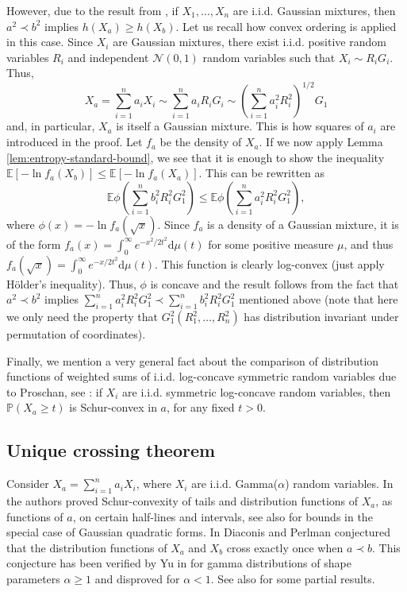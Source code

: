 \documentclass[11pt]{amsart}
\newcommand{\mb}[1]{\mathbb{{#1}}}
\newcommand{\mc}[1]{\mathcal{{#1}}}
\newcommand{\dd}{\mathrm{d}}
\newcommand{\1}{\mathbf{1}}
\newcommand{\E}{\mathbb{E}}
\theoremstyle{definition}
\theoremstyle{definition}
\theoremstyle{remark}
\begin{document}
However, due to the result from \cite{ENT18}, if $X_1,\ldots, X_n$ are i.i.d. Gaussian mixtures, then $a^2 \prec b^2$ implies $h(X_a) \geq h(X_b)$. Let us recall how convex ordering is applied in this case. Since $X_i$ are Gaussian mixtures, there exist i.i.d. positive random variables $R_i$ and independent $\mc{N}(0,1)$ random variables such that $X_i \sim R_i G_i$. Thus, 
\[
X_a = \sum_{i=1}^n a_i X_i \sim \sum_{i=1}^n a_i R_i G_i \sim \left(\sum_{i=1}^n a_i^2 R_i^2 \right)^{1/2} G_1
\]
and, in particular, $X_a$ is itself a Gaussian mixture.
This is how squares of $a_i$ are introduced in the proof. Let $f_a$ be the density of $X_a$. If we now apply Lemma \ref{lem:entropy-standard-bound}, we see that it is enough to show the inequality $\E[-\ln f_a(X_b)] \leq \E[-\ln f_a(X_a)]$. This can be rewritten as 
\[
\E \phi\left(\sum_{i=1}^n b_i^2 R_i^2 G_1^2 \right) \leq \E \phi\left(\sum_{i=1}^n a_i^2 R_i^2 G_1^2 \right), 
\]
where $\phi(x) = -\ln f_a(\sqrt{x})$.  Since $f_a$ is a density of a Gaussian mixture, it is of the form $f_a(x) = \int_0^\infty e^{-x^2/2t^2} \dd \mu(t)$ for some positive measure $\mu$, and thus $f_a(\sqrt{x}) =\int_0^\infty e^{-x/2t^2} \dd \mu(t)$. This function is clearly log-convex (just apply H\"older's inequality). Thus, $\phi$ is concave and the result follows from the fact that $a^2 \prec b^2$ implies $\sum_{i=1}^n a_i^2 R_i^2 G_1^2  \prec \sum_{i=1}^n b_i^2 R_i^2 G_1^2$ mentioned above (note that here we only need the property that $G_1^2(R_1^2, \ldots, R_n^2)$ has distribution invariant under permutation of coordinates).     

Finally, we mention a very general fact about the comparison of distribution functions of weighted sums of i.i.d. log-concave symmetric random variables due to Proschan, see \cite{P65}: if $X_i$ are i.i.d. symmetric log-concave random variables, then $\mb{P}(X_a \geq t)$ is Schur-convex in $a$, for any fixed $t>0$.    

\subsection{Unique crossing theorem} Consider $X_a = \sum_{i=1}^n a_i X_i$, where $X_i$ are i.i.d. Gamma($\alpha$) random variables.
In \cite{BDHP87} the authors proved Schur-convexity of tails and distribution functions of $X_a$, as functions of $a$, on certain half-lines and intervals, see also \cite{B96} for bounds in the special case of Gaussian quadratic forms. In \cite{DP90} Diaconis and Perlman conjectured that the distribution functions of $X_a$ and $X_b$ cross exactly once when $a\prec b$. This conjecture has been verified by Yu in \cite{Y17} for gamma distributions of shape parameters $\alpha \geq 1$ and disproved for $\alpha<1$. See also \cite{RS15} for some partial results.
\end{document}
